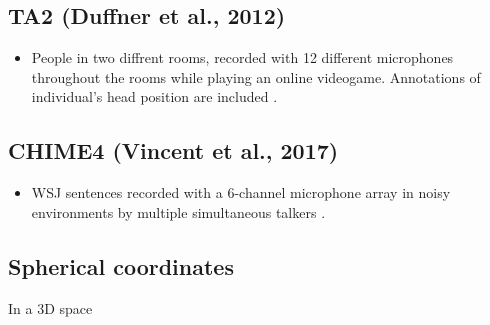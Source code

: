 \documentclass[14pt, legalpaper]{extarticle}
\begin{document}
\subsection{TA2 (Duffner et al., 2012)}

\begin{itemize}

\item People in two diffrent rooms, recorded with 12 different microphones throughout the rooms while playing an online videogame. Annotations of individual's head position are included \cite{duffner2012ta2}.

\end{itemize}

\subsection{CHIME4 (Vincent et al., 2017)}

\begin{itemize}

\item WSJ sentences recorded with a 6-channel microphone array in noisy environments by multiple simultaneous talkers \cite{vincent2017analysis}.

\end{itemize}

\begin{Appendices}

\section{Spherical coordinates}

\begin{itemize}
\end{itemize}
In a 3D space


\end{Appendices}



\end{document}
